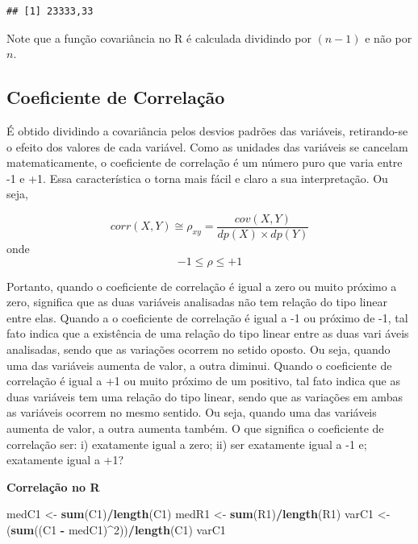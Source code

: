 \documentclass[
]{book}
\newenvironment{Shaded}{\begin{snugshade}}{\end{snugshade}}
\newcommand{\DecValTok}[1]{\textcolor[rgb]{0.00,0.00,0.81}{#1}}
\newcommand{\KeywordTok}[1]{\textcolor[rgb]{0.13,0.29,0.53}{\textbf{#1}}}
\newcommand{\NormalTok}[1]{#1}
\newcommand{\OperatorTok}[1]{\textcolor[rgb]{0.81,0.36,0.00}{\textbf{#1}}}
\newcommand{\StringTok}[1]{\textcolor[rgb]{0.31,0.60,0.02}{#1}}
\begin{document}
\begin{verbatim}
## [1] 23333,33
\end{verbatim}

Note que a função covariância no R é calculada dividindo por \((n-1)\) e não por \(n\).

\hypertarget{coeficiente-de-correlauxe7uxe3o}{%
\subsection{Coeficiente de Correlação}\label{coeficiente-de-correlauxe7uxe3o}}

É obtido dividindo a covariância pelos desvios padrões das variáveis, retirando-se o efeito dos valores de cada variável. Como as unidades das variáveis se cancelam matematicamente, o coeficiente de correlação é um número puro que varia entre -1 e +1. Essa característica o torna mais fácil e claro a sua interpretação. Ou seja,

\begin{equation*}
 corr(X,Y) \cong \rho_{xy} = \frac{cov(X,Y)}{dp(X) \times dp(Y)}
\end{equation*}
onde
\begin{equation*}
  -1 \leq \rho \leq +1
\end{equation*}

Portanto, quando o coeficiente de correlação é igual a zero ou muito próximo a zero, significa que as duas variáveis analisadas não tem relação do tipo linear entre elas. Quando a o coeficiente de correlação é igual a -1 ou próximo de -1, tal fato indica que a existência de uma relação do tipo linear entre as duas vari
áveis analisadas, sendo que as variações ocorrem no setido oposto. Ou seja, quando uma das variáveis aumenta de valor, a outra diminui. Quando o coeficiente de correlação é igual a +1 ou muito próximo de um positivo, tal fato indica que as duas variáveis tem uma relação do tipo linear, sendo que as variações em ambas as variáveis ocorrem no mesmo sentido. Ou seja, quando uma das variáveis aumenta de valor, a outra aumenta também. O que significa o coeficiente de correlação ser: i) exatamente igual a zero; ii) ser exatamente igual a -1 e; exatamente igual a +1?

\textbf{Correlação no R}

\begin{Shaded}
\begin{Highlighting}[]
\NormalTok{medC1 <-}\StringTok{ }\KeywordTok{sum}\NormalTok{(C1)}\OperatorTok{/}\KeywordTok{length}\NormalTok{(C1)}
\NormalTok{medR1 <-}\StringTok{ }\KeywordTok{sum}\NormalTok{(R1)}\OperatorTok{/}\KeywordTok{length}\NormalTok{(R1)}
\NormalTok{varC1 <-}\StringTok{ }\NormalTok{(}\KeywordTok{sum}\NormalTok{((C1 }\OperatorTok{-}\StringTok{ }\NormalTok{medC1)}\OperatorTok{^}\DecValTok{2}\NormalTok{))}\OperatorTok{/}\KeywordTok{length}\NormalTok{(C1)}
\NormalTok{varC1}
\end{Highlighting}
\end{Shaded}
\end{document}
